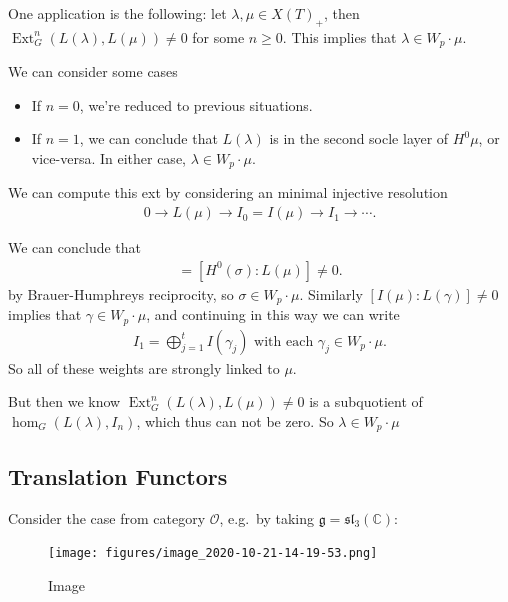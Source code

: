 \begin{remark}

One application is the following: let \(\lambda, \mu \in X(T)_+\), then
\(\operatorname{Ext}_G^n(L(\lambda), L(\mu)) \neq 0\) for some
\(n \geq 0\). This implies that \(\lambda \in W_p \cdot \mu\).

We can consider some cases

\begin{itemize}
\tightlist
\item
  If \(n=0\), we're reduced to previous situations.
\item
  If \(n=1\), we can conclude that \(L(\lambda)\) is in the second socle
  layer of \(H^0 \mu\), or vice-versa. In either case,
  \(\lambda \in W_p \cdot \mu\).
\end{itemize}

We can compute this ext by considering an minimal injective resolution
\begin{align*}  
0 \to L(\mu) \to I_0 = I(\mu) \to I_1 \to \cdots
.\end{align*}

We can conclude that
\begin{align*}
[I(\mu) : H^0(\sigma)] = [H^0(\sigma): L(\mu)] \neq 0
.\end{align*}
by Brauer-Humphreys reciprocity, so \(\sigma \in W_p \cdot \mu\).
Similarly \([I(\mu): L(\gamma)] \neq 0\) implies that
\(\gamma \in W_p \cdot \mu\), and continuing in this way we can write
\begin{align*}
I_1 = \bigoplus_{j=1}^t I(\gamma_j) 
\text{ with each } 
\gamma_j \in W_p \cdot \mu
.\end{align*}
So all of these weights are strongly linked to \(\mu\).

But then we know \(\operatorname{Ext}_G^n (L(\lambda), L(\mu)) \neq 0\)
is a subquotient of \(\hom_G(L(\lambda), I_n)\), which thus can not be
zero. So \(\lambda \in W_p \cdot \mu\)

\end{remark}

\hypertarget{translation-functors}{%
\subsection{Translation Functors}\label{translation-functors}}

Consider the case from category \({\mathcal{O}}\), e.g.~by taking
\({\mathfrak{g}}= {\mathfrak{sl}}_3({\mathbb{C}})\):

\begin{figure}
\centering
\texttt{[image: figures/image\_2020-10-21-14-19-53.png]}
\caption{Image}
\end{figure}

